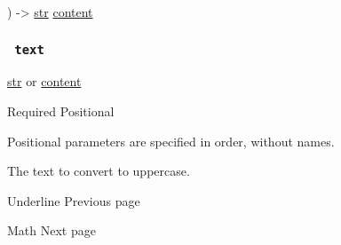 ) -\textgreater{} \href{/docs/reference/foundations/str/}{str}
\href{/docs/reference/foundations/content/}{content}

\subsubsection{\texorpdfstring{\texttt{\ text\ }}{ text }}\label{parameters-text}

\href{/docs/reference/foundations/str/}{str} {or}
\href{/docs/reference/foundations/content/}{content}

{Required} {{ Positional }}

\label{parameters-text-positional-tooltip}
Positional parameters are specified in order, without names.

The text to convert to uppercase.

\href{/docs/reference/text/underline/}{\pandocbounded{}}

{ Underline } { Previous page }

\href{/docs/reference/math/}{\pandocbounded{}}

{ Math } { Next page }
